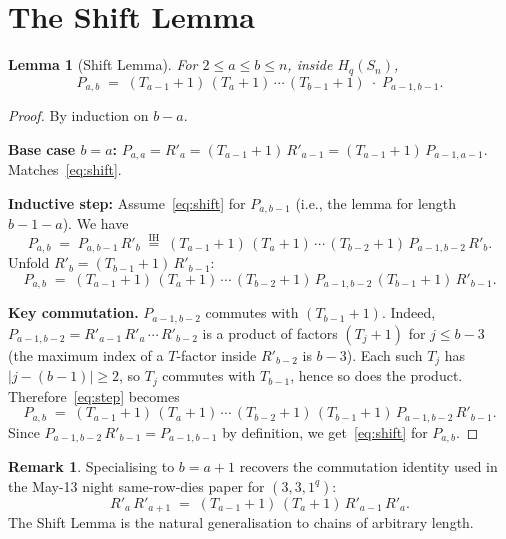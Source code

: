 \documentclass[11pt]{article}
\newtheorem{lemma}[theorem]{Lemma}
\theoremstyle{definition}
\newtheorem{remark}[theorem]{Remark}
\begin{document}
\section{The Shift Lemma}\label{sec:shift}

\begin{lemma}[Shift Lemma]\label{lem:shift}
For $2 \le a \le b \le n$, inside $H_q(S_n)$,
\begin{equation}\label{eq:shift}
   P_{a, b}
   \;=\;
   (T_{a-1}+1)\,(T_a+1)\,\cdots\,(T_{b-1}+1)\;\cdot\; P_{a-1, b-1}.
\end{equation}
\end{lemma}

\begin{proof}
By induction on $b - a$.

\medskip\noindent\textbf{Base case $b = a$:}  $P_{a, a} = R'_a =
(T_{a-1}+1)\,R'_{a-1} = (T_{a-1}+1)\,P_{a-1, a-1}$.  Matches~\eqref{eq:shift}.

\medskip\noindent\textbf{Inductive step:}  Assume~\eqref{eq:shift} for
$P_{a, b-1}$ (i.e., the lemma for length $b - 1 - a$).  We have
\[
   P_{a, b} \;=\; P_{a, b-1}\,R'_b
   \;\stackrel{\text{IH}}{=}\;
   (T_{a-1}+1)\,(T_a+1)\,\cdots\,(T_{b-2}+1)\,P_{a-1, b-2}\,R'_b.
\]
Unfold $R'_b = (T_{b-1}+1)\,R'_{b-1}$:
\begin{equation}\label{eq:step}
   P_{a, b}
   \;=\;
   (T_{a-1}+1)\,(T_a+1)\,\cdots\,(T_{b-2}+1)\,P_{a-1, b-2}\,(T_{b-1}+1)\,R'_{b-1}.
\end{equation}

\textbf{Key commutation.} $P_{a-1, b-2}$ commutes with $(T_{b-1}+1)$.
Indeed, $P_{a-1, b-2} = R'_{a-1}\,R'_a\,\cdots\,R'_{b-2}$ is a product of
factors $(T_j{+}1)$ for $j \le b - 3$ (the maximum index of a $T$-factor
inside $R'_{b-2}$ is $b - 3$).  Each such $T_j$ has $|j - (b-1)| \ge 2$,
so $T_j$ commutes with $T_{b-1}$, hence so does the product.
Therefore~\eqref{eq:step} becomes
\[
   P_{a, b}
   \;=\;
   (T_{a-1}+1)\,(T_a+1)\,\cdots\,(T_{b-2}+1)\,(T_{b-1}+1)\,P_{a-1, b-2}\,R'_{b-1}.
\]
Since $P_{a-1, b-2}\,R'_{b-1} = P_{a-1, b-1}$ by definition, we
get~\eqref{eq:shift} for $P_{a, b}$.
\end{proof}

\begin{remark}\label{rem:shift-special-case}
Specialising to $b = a + 1$ recovers the commutation identity used in
the May-13 night same-row-dies paper for $(3, 3, 1^q)$:
\[
   R'_a\,R'_{a+1}
   \;=\;
   (T_{a-1}+1)\,(T_a+1)\,R'_{a-1}\,R'_a.
\]
The Shift Lemma is the natural generalisation to chains of arbitrary
length.
\end{remark}
\end{document}
